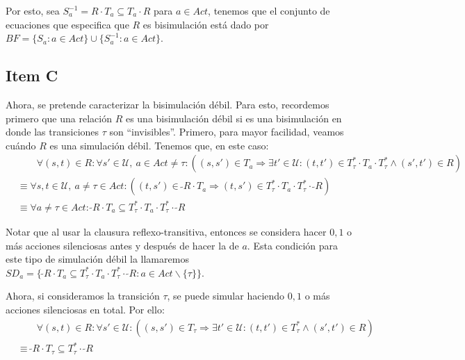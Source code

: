 \documentclass{article}
\newcommand{\U}{\mathcal{U}}
\newcommand{\conv}[1]{\ \tilde{}#1}
\begin{document}
Por esto, sea $S^{-1}_a = R \cdot T_a \subseteq T_a \cdot R$ para $a \in Act$, tenemos que el conjunto de ecuaciones que especifica que $R$ es bisimulación está dado por $BF = \{S_a : a \in Act\} \cup \{S^{-1}_a : a \in Act\}$.

\subsection*{Item C}
Ahora, se pretende caracterizar la bisimulación débil.
Para esto, recordemos primero que una relación $R$ es una bisimulación débil si es una bisimulación en donde las transiciones $\tau$ son ``invisibles''.
Primero, para mayor facilidad, veamos cuándo $R$ es una simulación débil.
Tenemos que, en este caso:
\begin{equation*}
  \begin{aligned}
    &\qquad \forall (s, t) \in R : \forall s' \in \U,\ a \in Act \neq \tau : ((s, s') \in T_a \Rightarrow \exists t' \in \U : (t, t') \in T_\tau^* \cdot T_a \cdot T_\tau^* \land (s', t') \in R) \\ 
    &\equiv \forall s, t \in \U,\ a \neq \tau \in Act : ((t, s') \in \conv{R} \cdot T_a \Rightarrow (t, s') \in T_\tau^* \cdot T_a \cdot T_\tau^* \cdot \conv{R}) \\
    &\equiv \forall a \neq \tau \in Act : \conv{R} \cdot T_a \subseteq T_\tau^* \cdot T_a \cdot T_\tau^* \cdot \conv{R}
  \end{aligned}
\end{equation*}

Notar que al usar la clausura reflexo-transitiva, entonces se considera hacer $0, 1$ o más acciones silenciosas antes y después de hacer la de $a$.
Esta condición para este tipo de simulación débil la llamaremos $SD_a = \{\conv{R} \cdot T_a \subseteq T_\tau^* \cdot T_a \cdot T_\tau^* \cdot \conv{R} : a \in Act \smallsetminus \{\tau\}\}$.

Ahora, si consideramos la transición $\tau$, se puede simular haciendo $0, 1$ o más acciones silenciosas en total.
Por ello:
\begin{equation*}
  \begin{aligned}
    &\qquad \forall (s, t) \in R : \forall s' \in \U : ((s, s') \in T_\tau \Rightarrow \exists t' \in \U : (t, t') \in T_\tau^* \land (s', t') \in R) \\ 
    &\equiv \conv{R} \cdot T_\tau \subseteq T_\tau^* \cdot \conv{R}
  \end{aligned}
\end{equation*}
\end{document}
